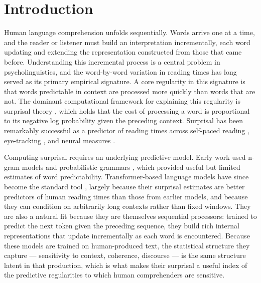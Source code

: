 \documentclass[12pt]{article}
\begin{document}
\newpage

\section{Introduction}

Human language comprehension unfolds sequentially. Words arrive one at a time, and the reader or listener must build an interpretation incrementally, each word updating and extending the representation constructed from those that came before. Understanding this incremental process is a central problem in psycholinguistics, and the word-by-word variation in reading times has long served as its primary empirical signature. A core regularity in this signature is that words predictable in context are processed more quickly than words that are not. The dominant computational framework for explaining this regularity is surprisal theory \citep{hale2001,levy2008}, which holds that the cost of processing a word is proportional to its negative log probability given the preceding context. %
Surprisal has been remarkably successful as a predictor of reading times across self-paced reading \citep{smith2013}, eye-tracking \citep{demberg2008}, and neural measures \citep{frank2015}.

Computing surprisal requires an underlying predictive model. Early work used n-gram models and probabilistic grammars \citep{hale2001,demberg2008,roark2009}, which provided useful but limited estimates of word predictability. Transformer-based language models have since become the standard tool \citep{goodkind2018,wilcox2020,schrimpf2021}, largely because their surprisal estimates are better predictors of human reading times than those from earlier models, and because they can condition on arbitrarily long contexts rather than fixed windows. They are also a natural fit because they are themselves sequential processors: trained to predict the next token given the preceding sequence, they build rich internal representations that update incrementally as each word is encountered. Because these models are trained on human-produced text, the statistical structure they capture --- sensitivity to context, coherence, discourse --- is the same structure latent in that production, which is what makes their surprisal a useful index of the predictive regularities to which human comprehenders are sensitive.
\end{document}
